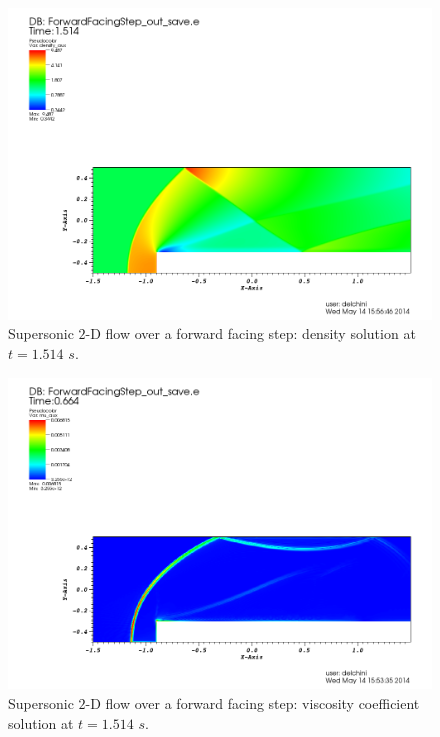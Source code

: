 \begin{figure}[H]
\centering
\includegraphics[width=\textwidth]{figures/FFSDensityEqualTo1p514.png}
\caption{Supersonic $2$-D flow over a forward facing step: density solution at $t=1.514$ $s$.}
\label{fig:2d_ffs_rho_1514}
\end{figure}
%
\begin{figure}[H]
\centering
\includegraphics[width=\textwidth]{figures/FFSViscEqualTo0p664.png}
\caption{Supersonic $2$-D flow over a forward facing step: viscosity coefficient solution at $t=1.514$ $s$.}
\label{fig:2d_ffs_visc_1514}
\end{figure}
%
